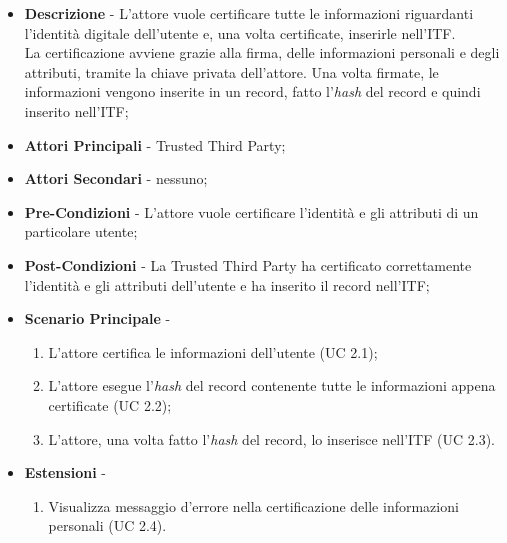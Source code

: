 \begin{itemize}
	\item \textbf{Descrizione} - L'attore vuole certificare tutte le informazioni riguardanti l'identità digitale dell'utente e, una volta certificate, inserirle nell'\gls{ITF}.\\
	La certificazione avviene grazie alla firma, delle informazioni personali e degli attributi, tramite la chiave privata dell'attore. Una volta firmate, le informazioni vengono inserite in un record, fatto l'\textit{hash} del record e quindi inserito nell'\gls{ITF};	
	\item \textbf{Attori Principali} - Trusted Third Party;
	\item \textbf{Attori Secondari} - nessuno;
	\item \textbf{Pre-Condizioni} - L'attore vuole certificare l'identità e gli attributi di un particolare utente;
	\item \textbf{Post-Condizioni} - La Trusted Third Party ha certificato correttamente l'identità e gli attributi dell'utente e ha inserito il record nell'\gls{ITF};
	\item \textbf{Scenario Principale} -
	\begin{enumerate}
		\item L'attore certifica le informazioni dell'utente (UC 2.1);
		\item L'attore esegue l'\textit{hash} del record contenente tutte le informazioni appena certificate (UC 2.2);
		\item L'attore, una volta fatto l'\textit{hash} del record, lo inserisce nell'\gls{ITF} (UC 2.3).
	\end{enumerate}
	\item \textbf{Estensioni} -
	\begin{enumerate}
		\item Visualizza messaggio d'errore nella certificazione delle informazioni personali (UC 2.4).
	\end{enumerate}
\end{itemize}

